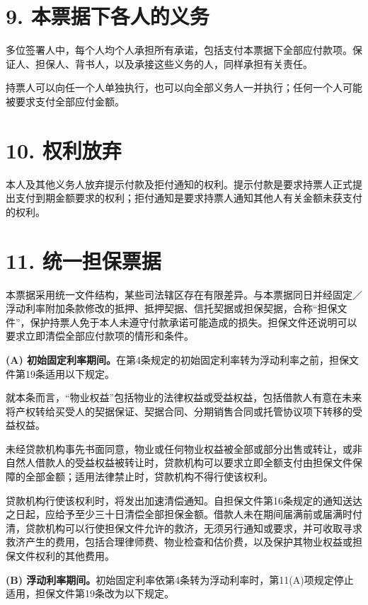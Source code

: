 \documentclass[UTF8,fontset=none,11pt,a4paper]{ctexart}
\begin{document}
\section*{9. 本票据下各人的义务}
多位签署人中，每个人均个人承担所有承诺，包括支付本票据下全部应付款项。保证人、担保人、背书人，以及承接这些义务的人，同样承担\allowbreak\mbox{有关责任。}


持票人可以向任一个人单独执行，也可以向全部义务人一并执行；任何一个人可能被要求支付全部\allowbreak\mbox{应付金额。}


\section*{10. 权利放弃}
本人及其他义务人放弃提示付款及拒付通知的权利。提示付款是要求持票人正式提出支付到期金额要求的权利；拒付通知是要求持票人通知其他人有关金额未获支\allowbreak\mbox{付的权利。}


\section*{11. 统一担保票据}
本票据采用统一文件结构，某些司法辖区存在有限差异。与本票据同日并经固定／浮动利率附加条款修改的抵押、抵押契据、信托契据或担保契据，合称“担保文件”，保护持票人免于本人未遵守付款承诺可能造成的损失。担保文件还说明可以要求立即清偿全部应付款项的情\allowbreak\mbox{形和条件。}


\textbf{(A) 初始固定利率期间。}在第4条规定的初始固定利率转为浮动利率之前，担保文件第19条适用\allowbreak\mbox{以下规定。}


就本条而言，“物业权益”包括物业的法律权益或受益权益，包括借款人有意在未来将产权转给买受人的契据保证、契据合同、分期销售合同或托管协议项下转移的\allowbreak\mbox{受益权益。}


未经贷款机构事先书面同意，物业或任何物业权益被全部或部分出售或转让，或非自然人借款人的受益权益被转让时，贷款机构可以要求立即全额支付由担保文件保障的全部金额；适用法律禁止时，贷款机构不得行\allowbreak\mbox{使该权利。}


贷款机构行使该权利时，将发出加速清偿通知。自担保文件第16条规定的通知送达之日起，应给予至少三十日清偿全部担保金额。借款人未在期间届满前或届满时付清，贷款机构可以行使担保文件允许的救济，无须另行通知或要求，并可收取寻求救济产生的费用，包括合理律师费、物业检查和估价费，以及保护其物业权益或担保文件权利的\allowbreak\mbox{其他费用。}


\textbf{(B) 浮动利率期间。}初始固定利率依第4条转为浮动利率时，第11(A)项规定停止适用，担保文件第19条改为\allowbreak\mbox{以下规定。}
\end{document}
